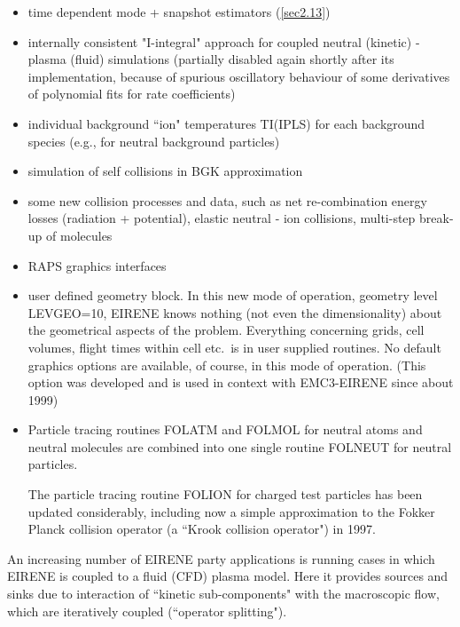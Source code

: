 \begin{itemize}
  \item[-] time dependent mode + snapshot estimators (\cref{sec2.13})
  \item[-]
        internally consistent "I-integral" approach for coupled neutral (kinetic) -
        plasma (fluid) simulations (partially disabled again shortly after its
        implementation, because of spurious oscillatory behaviour of some derivatives
        of polynomial fits for rate coefficients)
  \item[-] individual background ``ion"
        temperatures TI(IPLS) for each background species (e.g., for neutral background
        particles)
  \item[-] simulation of self collisions in \ac{BGK} approximation
  \item[-] some new collision processes and data, such as net re-combination
        energy losses (radiation + potential), elastic neutral - ion collisions,
        multi-step break-up of molecules
  \item[-] RAPS graphics interfaces
  \item[-]
        user defined geometry block.
        In this new mode of operation, geometry level LEVGEO=10, EIRENE knows nothing
        (not even the dimensionality) about the geometrical aspects of the problem.
        Everything concerning grids, cell volumes, flight times within cell etc.\ is in
        user supplied routines.
        No default graphics options are available, of course, in this mode of
        operation.
        (This option was developed and is used in context with EMC3-EIRENE since about
        1999)
  \item[-] Particle tracing routines FOLATM and FOLMOL for neutral atoms
        and neutral molecules are combined into one single routine FOLNEUT for neutral
        particles.

        The particle tracing routine FOLION for charged test particles has been updated
        considerably, including now a simple approximation to the Fokker Planck
        collision operator (a ``Krook collision operator") in 1997.
\end{itemize}
\bigskip
An increasing number of EIRENE  party applications is running
cases in which
EIRENE is coupled to a fluid (\ac{CFD}) plasma model.
Here it provides sources and sinks due to interaction of ``kinetic
sub-components" with the macroscopic flow, which are iteratively coupled
(``operator splitting").

